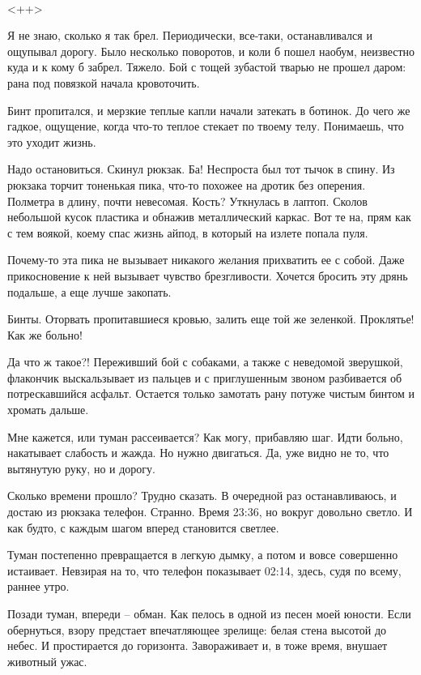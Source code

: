 \documentclass[a4paper]{book}
\begin{document}
\paragraph{}<++>



Я не знаю, сколько я так брел. Периодически, все-таки, останавливался и ощупывал дорогу. Было несколько поворотов, и коли б пошел наобум, неизвестно куда и к кому б забрел. Тяжело. Бой с тощей зубастой тварью не прошел даром: рана под повязкой начала кровоточить.

Бинт пропитался, и мерзкие теплые капли начали затекать в ботинок. До чего же гадкое, ощущение, когда что-то теплое стекает по твоему телу. Понимаешь, что это уходит жизнь. 

Надо остановиться. Скинул рюкзак. Ба! Неспроста был тот тычок в спину. Из рюкзака торчит тоненькая пика, что-то похожее на дротик без оперения. Полметра в длину, почти невесомая. Кость? Уткнулась в лаптоп. Сколов небольшой кусок пластика и обнажив металлический каркас. Вот те на, прям как с тем воякой, коему спас жизнь айпод, в который на излете попала пуля.

Почему-то эта пика не вызывает никакого желания прихватить ее с собой. Даже прикосновение к ней вызывает чувство брезгливости. Хочется бросить эту дрянь подальше, а еще лучше закопать. 

Бинты. Оторвать пропитавшиеся кровью, залить еще той же зеленкой. Проклятье! Как же больно! 

Да что ж такое?! Переживший бой с собаками, а также с неведомой зверушкой, флакончик выскальзывает из пальцев и с приглушенным звоном разбивается об потрескавшийся асфальт.  Остается только замотать рану потуже чистым бинтом и хромать дальше. 

Мне кажется, или туман рассеивается? Как могу, прибавляю шаг. Идти больно, накатывает слабость и жажда. Но нужно двигаться. Да, уже видно не то, что вытянутую руку, но и дорогу. 

Сколько времени прошло? Трудно сказать. В очередной раз останавливаюсь, и достаю из рюкзака телефон. Странно. Время 23:36, но вокруг довольно светло. И как будто, с каждым шагом вперед становится светлее.  

Туман постепенно превращается в легкую дымку, а потом и вовсе совершенно истаивает. Невзирая на то, что телефон показывает 02:14, здесь, судя по всему, раннее утро. 

Позади туман, впереди -- обман. Как пелось в одной из песен моей юности. Если обернуться, взору предстает впечатляющее зрелище: белая стена высотой до небес. И простирается до горизонта. Завораживает и, в тоже время, внушает животный ужас. 
\end{document}
